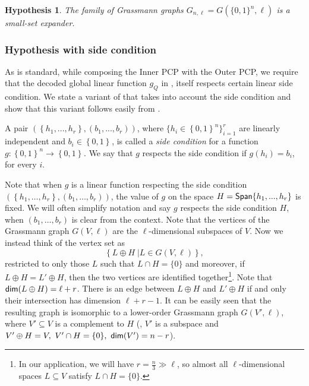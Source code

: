 \documentclass{toc}
\newtheorem{conj}[theorem]{Hypothesis}
\newcommand\sett[2]{\left\{ \left. #1 \;\right\vert #2 \right\}}
\newcommand\set[1]{{\left\{ #1 \right\}}}
\newcommand\power[1]{\set{0,1}^{#1}}
\newcommand\spn{{\sf Span}}
\newcommand*\xor{\mathbin{\oplus}}
\begin{document}
\begin{conj}\label{conj:v_expansion}
The family of Grassmann graphs $G_{n,\ell} = G(\{0,1\}^n,\ell)$ is a small-set expander.
\end{conj}

%
%
%
%
%
%
%
%
%
%
%
%
%
%
%
%
%
%
%
%
%
%

%


%
\subsubsection{Hypothesis with side condition}
As is standard, while composing the
%
Inner PCP with the Outer PCP,  %
we require that the decoded global linear
function $g_Q$ in ,  itself respects certain linear %
side condition.  %
We state a
variant of  that takes into account the side condition and show
that this variant follows easily from .


\begin{definition}
A pair $(\set{h_1,...,h_r},(b_1,...,b_r))$, where $\{ h_i\in \power{n} \}_{i=1}^r$  are linearly
independent and $b_i\in \power{}$,
is called a \emph{side condition} for a function $g\colon \power{n}\to\power{}$. We say that $g$ respects the side
condition if $g(h_i)=b_i$, for every $i$.
\end{definition}



Note that when $g$ is a linear function respecting the side condition $(\set{h_1,\ldots,h_r},(b_1,\ldots,b_r))$,
the value of $g$ on the space $H=\spn\set{h_1,...,h_r}$ is fixed. We will often simplify notation and say
$g$ respects the side condition $H$, when $ (b_1,\ldots,b_r)$ is clear from the context. Note that the
vertices of the Grassmann graph $G(V,\ell)$ are
%
%
the  %
$\ell$-dimensional subspaces of $V$. Now we instead think of the
vertex set as
 $$  \sett{L\xor H}{L\in G(V,\ell)},$$
restricted to only those $L$ such that $L \cap H = \{0\}$ and moreover, if $L \xor H = L' \xor H$, then the two
vertices are identified together\footnote{
In our application, we will have $r = \frac{n}{3} \gg \ell$, so almost all $\ell$-dimensional spaces $L \subseteq V$ satisfy
$L \cap H = \{ 0 \}$. }. Note that ${\sf dim}(L\xor H) = \ell+r$. There is an edge between $L \xor H$ and $L' \xor H$ if and only
their intersection has dimension $\ell+r-1$. It can be easily seen that the resulting graph is isomorphic to a %
lower-order  %
Grassmann graph $G(V', \ell)$, where $V'\subseteq V$ is a
%
complement  %
to $H$ (\ie, $V'$ is a subspace and $V' \xor H = V, ~V'\cap H = \{0\}, ~{\sf dim}(V')=n-r$).
\end{document}
